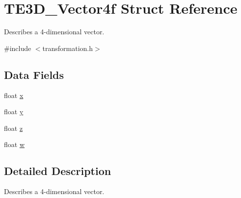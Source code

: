 \hypertarget{struct_t_e3_d___vector4f}{\section{T\-E3\-D\-\_\-\-Vector4f Struct Reference}
\label{struct_t_e3_d___vector4f}
}


Describes a 4-\/dimensional vector.  




{\ttfamily \#include $<$transformation.\-h$>$}

\subsection*{Data Fields}
\begin{DoxyCompactItemize}
\item 
float \hyperlink{struct_t_e3_d___vector4f_ad0da36b2558901e21e7a30f6c227a45e}{x}
\item 
float \hyperlink{struct_t_e3_d___vector4f_aa4f0d3eebc3c443f9be81bf48561a217}{y}
\item 
float \hyperlink{struct_t_e3_d___vector4f_af73583b1e980b0aa03f9884812e9fd4d}{z}
\item 
float \hyperlink{struct_t_e3_d___vector4f_a56eca241e2896b9f57a79589e76fd24b}{w}
\end{DoxyCompactItemize}


\subsection{Detailed Description}
Describes a 4-\/dimensional vector. 

